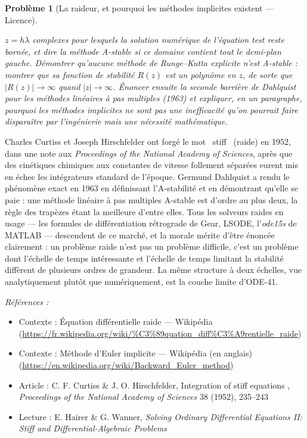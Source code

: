 \documentclass[11pt]{article}
\newtheorem{problem}{Problème}
\newenvironment{refs}{\par\small\noindent\emph{Références :}\begin{itemize}\setlength\itemsep{0pt}}{\end{itemize}\normalsize}
\begin{document}
\begin{problem}[{La raideur, et pourquoi les méthodes implicites existent --- Licence}]
\begin{enumerate}
$ z = h\lambda $ complexes pour lesquels la solution numérique de l'équation test reste bornée,
et dire la méthode A-stable si ce domaine contient tout le demi-plan gauche. Démontrer qu'aucune
méthode de Runge--Kutta explicite n'est A-stable : montrer que sa fonction de stabilité
$ R(z) $ est un polynôme en $ z $, de sorte que $ |R(z)| \to \infty $ quand
$ |z| \to \infty $. Énoncer ensuite la seconde barrière de Dahlquist pour les méthodes
linéaires à pas multiples (1963) et expliquer, en un paragraphe, pourquoi les méthodes implicites
ne sont pas une inefficacité qu'on pourrait faire disparaître par l'ingénierie mais une nécessité
mathématique.
\end{enumerate}

\end{problem}

\noindent Charles Curtiss et Joseph Hirschfelder ont forgé le mot \og{}~stiff~\fg{}
(raide) en 1952, dans une note aux \textit{Proceedings of the National Academy of Sciences}, après
que des cinétiques chimiques aux constantes de vitesse follement séparées eurent mis en échec les
intégrateurs standard de l'époque. Germund Dahlquist a rendu le phénomène exact en 1963 en
définissant l'A-stabilité et en démontrant qu'elle se paie : une méthode linéaire à pas multiples
A-stable est d'ordre au plus deux, la règle des trapèzes étant la meilleure d'entre elles. Tous
les solveurs raides en usage --- les formules de différentiation rétrograde de Gear, LSODE,
l'\textit{ode15s} de MATLAB --- descendent de ce marché, et la morale mérite d'être énoncée clairement :
un problème raide n'est pas un problème difficile, c'est un problème dont l'échelle de temps
intéressante et l'échelle de temps limitant la stabilité diffèrent de plusieurs ordres de
grandeur. La même structure à deux échelles, vue analytiquement plutôt que numériquement, est la
couche limite d'ODE-41.

\begin{refs}
\item Contexte : Équation différentielle raide --- Wikipédia (\url{https://fr.wikipedia.org/wiki/%C3%89quation_diff%C3%A9rentielle_raide})
\item Contexte : Méthode d'Euler implicite --- Wikipédia (en anglais) (\url{https://en.wikipedia.org/wiki/Backward_Euler_method})
\item Article : C. F. Curtiss \& J. O. Hirschfelder, \og{} Integration of stiff equations \fg{}, \textit{Proceedings of the National Academy of Sciences} 38 (1952), 235--243
\item Lecture : E. Hairer \& G. Wanner, \textit{Solving Ordinary Differential Equations II: Stiff and Differential-Algebraic Problems}
\end{refs}
\end{document}
